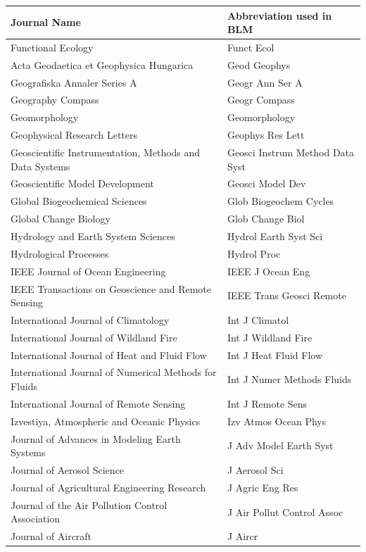 \begin{longtable}{| p{8 cm} | p{6 cm} |}
\hline
Journal Name & Abbreviation used in BLM \\
\hline
Functional Ecology & Funct Ecol \\
\hline
Acta Geodaetica et Geophysica Hungarica & Geod Geophys \\
Geografiska Annaler Series A & Geogr Ann Ser A \\
Geography Compass & Geogr Compass \\
Geomorphology & Geomorphology \\
Geophysical Research Letters & Geophys Res Lett \\
Geoscientific Instrumentation, Methods and Data Systems & Geosci Instrum Method Data Syst \\
Geoscientific Model Development & Geosci Model Dev \\
Global Biogeochemical Sciences & Glob Biogeochem Cycles \\
Global Change Biology & Glob Change Biol \\
\hline
Hydrology and Earth System Sciences & Hydrol Earth Syst Sci \\
Hydrological Processes & Hydrol Proc \\
\hline
IEEE Journal of Ocean Engineering & IEEE J Ocean Eng \\
IEEE Transactions on Geoscience and Remote Sensing & IEEE Trans Geosci Remote \\
International Journal of Climatology & Int J Climatol \\
International Journal of Wildland Fire & Int J Wildland Fire \\
International Journal of Heat and Fluid Flow & Int J Heat Fluid Flow \\
International Journal of Numerical Methods for Fluids & Int J Numer Methods Fluids \\
International Journal of Remote Sensing & Int J Remote Sens \\
Izvestiya, Atmospheric and Oceanic Physics & Izv Atmos Ocean Phys \\
\hline
Journal of Advances in Modeling Earth Systems & J Adv Model Earth Syst \\
Journal of Aerosol Science & J Aerosol Sci \\
Journal of Agricultural Engineering Research & J Agric Eng Res \\
Journal of the Air Pollution Control Association & J Air Pollut Control Assoc \\
Journal of Aircraft & J Aircr \\

\end{longtable}
